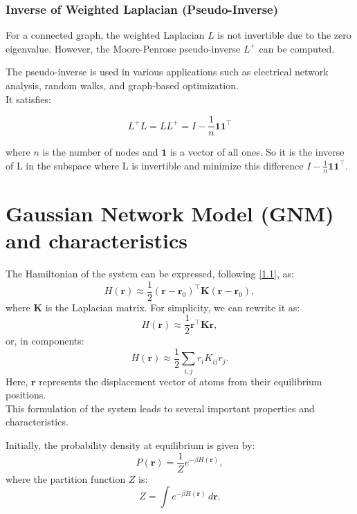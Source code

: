 \documentclass[English, Lau, oneside]{sapthesis}
\begin{document}
\subsubsection{Inverse of Weighted Laplacian (Pseudo-Inverse)}
For a connected graph, the weighted Laplacian \( L \) is not invertible due to the zero eigenvalue. However, the Moore-Penrose pseudo-inverse \( L^+ \) can be computed. 

The pseudo-inverse is used in various applications such as electrical network analysis, random walks, and graph-based optimization.\\ It satisfies:

\[
L^+ L = L L^+ = I - \frac{1}{n} \mathbf{1} \mathbf{1}^\top
\]

where \( n \) is the number of nodes and \( \mathbf{1} \) is a vector of all ones.
So it is the inverse of L in the subspace where L is invertible and minimize this difference $I - \frac{1}{n} \mathbf{1} \mathbf{1}^\top$.
\newpage
\section{Gaussian Network Model (GNM) and characteristics}
\noindent The Hamiltonian of the system can be expressed, following \eqref{1.1}, as:\cite{ref12}
\begin{equation}
    H(\mathbf{r}) \approx \frac{1}{2} (\mathbf{r} - \mathbf{r}_0)^\top \mathbf{K} (\mathbf{r} - \mathbf{r}_0),
\end{equation}
where \( \mathbf{K} \) is the Laplacian matrix. For simplicity, we can rewrite it as:
\begin{equation}
    H(\mathbf{r}) \approx \frac{1}{2} \mathbf{r}^\top \mathbf{K} \mathbf{r},
\end{equation}
or, in components:
\begin{equation}
    H(\mathbf{r}) \approx \frac{1}{2} \sum_{i,j} r_i K_{ij} r_j.
\end{equation}
Here, \(\mathbf{r}\) represents the displacement vector of atoms from their equilibrium positions.\\
This formulation of the system leads to several important properties and characteristics.

Initially, the probability density at equilibrium is given by:\cite{ref12}
\begin{equation}
    P(\mathbf{r}) = \frac{1}{Z} e^{-\beta H(\mathbf{r})},
\end{equation}
where the partition function \(Z\) is:
\begin{equation}
    Z = \int e^{-\beta H(\mathbf{r})} \, d\mathbf{r}.
\end{equation}
\end{document}
